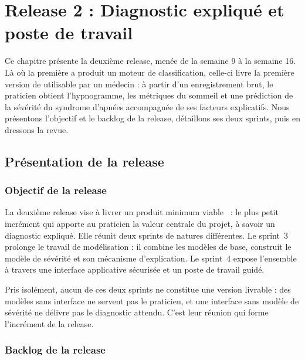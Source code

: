 \chapter{Release 2 : Diagnostic expliqué et poste de travail}
\label{chap:release2}


Ce chapitre présente la deuxième release, menée de la semaine 9 à la semaine 16. Là où la
première a produit un moteur de classification, celle-ci livre la première version de
\hypnoria{} utilisable par un médecin : à partir d'un enregistrement brut, le praticien
obtient l'hypnogramme, les métriques du sommeil et une prédiction de la sévérité du syndrome
d'apnées accompagnée de ses facteurs explicatifs. Nous présentons l'objectif et le backlog
de la release, détaillons ses deux sprints, puis en dressons la revue.

\section{Présentation de la release}
\label{sec:release2}

\subsection{Objectif de la release}

La deuxième release vise à livrer un produit minimum viable~\cite{ries2011} : le plus petit
incrément qui apporte au praticien la valeur centrale du projet, à savoir un diagnostic
expliqué. Elle réunit deux sprints de natures différentes. Le sprint~3 prolonge le travail
de modélisation : il combine les modèles de base, construit le modèle de sévérité et son
mécanisme d'explication. Le sprint~4 expose l'ensemble à travers une interface applicative
sécurisée et un poste de travail guidé.

Pris isolément, aucun de ces deux sprints ne constitue une version livrable : des modèles
sans interface ne servent pas le praticien, et une interface sans modèle de sévérité ne
délivre pas le diagnostic attendu. C'est leur réunion qui forme l'incrément de la release.

\subsection{Backlog de la release}

